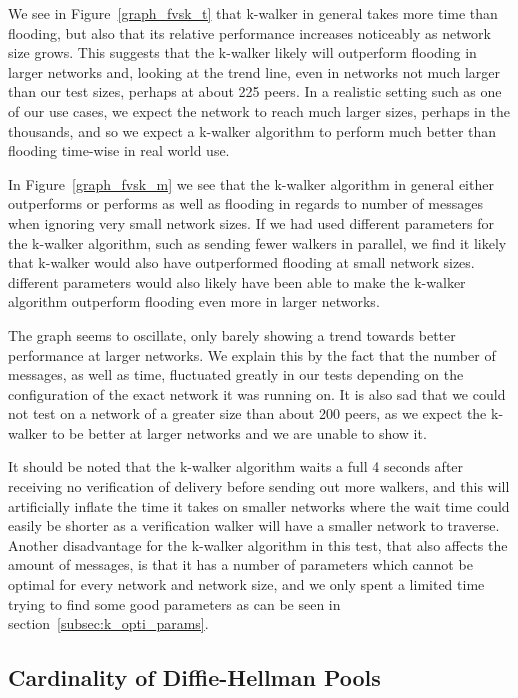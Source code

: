 We see in Figure~\ref{graph_fvsk_t} that k-walker in general takes more time than flooding, but also that its relative performance increases noticeably as network size grows. This suggests that the k-walker likely will outperform flooding in larger networks and, looking at the trend line, even in networks not much larger than our test sizes, perhaps at about 225 peers. In a realistic setting such as one of our use cases, we expect the network to reach much larger sizes, perhaps in the thousands, and so we expect a k-walker algorithm to perform much better than flooding time-wise in real world use.

In Figure~\ref{graph_fvsk_m} we see that the k-walker algorithm in general either outperforms or performs as well as flooding in regards to number of messages when ignoring very small network sizes.
If we had used different parameters for the k-walker algorithm, such as sending fewer walkers in parallel, we find it likely that k-walker would also have outperformed flooding at small network sizes. different parameters would also likely have been able to make the k-walker algorithm outperform flooding even more in larger networks.

The graph seems to oscillate, only barely showing a trend towards better performance at larger networks. We explain this by the fact that the number of messages, as well as time, fluctuated greatly in our tests depending on the configuration of the exact network it was running on. It is also sad that we could not test on a network of a greater size than about 200 peers, as we expect the k-walker to be better at larger networks and we are unable to show it.

It should be noted that the k-walker algorithm waits a full 4 seconds after receiving no verification of delivery before sending out more walkers, and this will artificially inflate the time it takes on smaller networks where the wait time could easily be shorter as a verification walker will have a smaller network to traverse. Another disadvantage for the k-walker algorithm in this test, that also affects the amount of messages, is that it has a number of parameters which cannot be optimal for every network and network size, and we only spent a limited time trying to find some good parameters as can be seen in section~\ref{subsec:k_opti_params}.

\subsection{Cardinality of Diffie-Hellman Pools}

